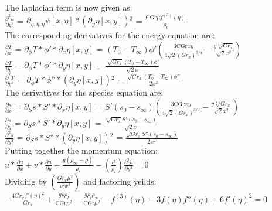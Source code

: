 \documentclass[letterpaper, 10pt]{article}
\begin{document}
\noindent The laplacian term is now given as:\\
$\frac{\partial^2 u}{\partial y^2}$ = $\partial _{\eta ,\eta ,\eta }\psi [x,\eta ]*\left(\partial _y\eta [x,y]\right){}^3$ = $\frac{\text{CGr} \mu  f^{(3)}(\eta )}{\rho_l}$\\

\noindent The corresponding derivatives for the energy equation are:\\
$\frac{\partial T}{\partial x}$ = $\partial _{\phi }T*\phi '*\partial _x\eta [x,y]$ = 
$(T_0-T_\infty) \phi ' \left(\frac{3 \text{CGr} x y}{4 \sqrt{2} \left(Gr_x\right)^{3/4}}-\frac{y \sqrt[4]{Gr_x}}{\sqrt{2} x^2}\right)$\\
$\frac{\partial T}{\partial y}$ = $ \partial _{\phi }T*\phi '*\partial _y\eta [x,y]$ = $\frac{\sqrt[4]{Gr_x} (T_0-T_\infty) \phi '}{\sqrt{2} x}$\\
$\frac{\partial^2 T}{\partial y^2}$ = $\partial _{\phi }T*\phi \text{''}*\left(\partial _y\eta [x,y]\right){}^2$ = $\frac{\sqrt{Gr_x} (T_0-T_\infty) \phi ''}{2 x^2}$\\

\noindent The derivatives for the species equation are:\\
$\frac{\partial s}{\partial x}$ = $\partial _Ss * S'*\partial _x\eta [x,y]$ = $S' (s_0-s_\infty) \left(\frac{3 \text{CGr} x y}{4 \sqrt{2} \left(Gr_x\right)^{3/4}}-\frac{y \sqrt[4]{Gr_x}}{\sqrt{2} x^2}\right)$\\
$\frac{\partial s}{\partial y}$ = $\partial _Ss * S'*\partial _y\eta [x,y]$ = $\frac{\sqrt[4]{Gr_x} S' (s_0-s_\infty)}{\sqrt{2} x}$\\
$\frac{\partial^2 s}{\partial y^2}$ = $\partial _Ss* S\text{''}*\left(\partial _y\eta [x,y]\right){}^2$ = $\frac{\sqrt{Gr_x} S'' (s_0-s_\infty)}{2 x^2}$\\

\noindent Putting together the momentum equation:\\
$u*\frac{\partial u}{\partial x}+v*\frac{\partial u}{\partial y}-\frac{g(\rho_\infty -\rho )}{\rho_l}-\left(\frac{\mu }{\rho_l}\right)\frac{\partial^2 u}{\partial y^2} = 0$\\

\noindent Dividing by $\left(\frac{Gr_x\mu ^2}{ \rho_l^2 x^3}\right)$ and factoring yeilds:\\
$-\frac{4 Gr_x f'(\eta )^2}{Gr_x}+\frac{g \rho  \rho_l}{\text{CGr} \mu^2}-\frac{g \rho_l \rho_\infty}{\text{CGr} \mu^2}-f^{(3)}(\eta )-3 f(\eta ) f''(\eta )+6 f'(\eta )^2 = 0$\\
\end{document}
